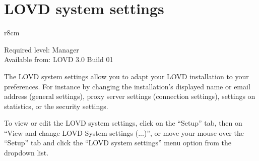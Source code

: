 \section{LOVD system settings}
\begin{wrapfigure}[3]{r}{8cm} %
  \vspace{-25pt}
  \begin{leftbar}
    Required level: Manager\\
    Available from: LOVD 3.0 Build 01
  \end{leftbar}
\end{wrapfigure}
The LOVD system settings allow you to adapt your LOVD installation to your preferences.
For instance by changing the installation's displayed name or email address (general settings),
 proxy server settings (connection settings), settings on statistics, or the security settings.

To view or edit the LOVD system settings, click on the ``Setup'' tab,
 then on ``View and change LOVD System settings (...)'',
or move your mouse over the ``Setup'' tab and click the ``LOVD system settings'' menu option from the dropdown list.



